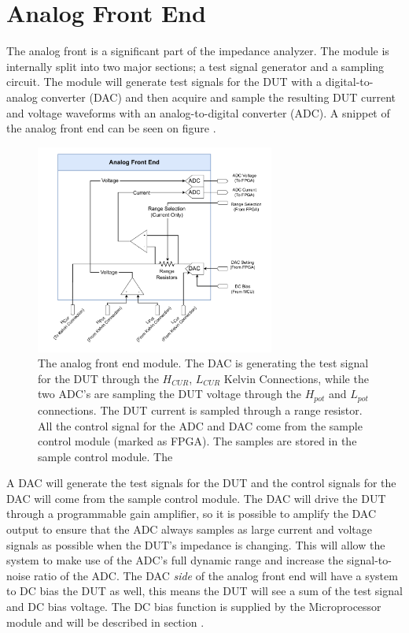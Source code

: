 \section{Analog Front End} \label{sec:AnalogFrontEnd}

The analog front is a significant part of the impedance analyzer. The module is internally split into two major sections; a test signal generator and a sampling circuit. The module will generate test signals for the DUT with a digital-to-analog converter (DAC) and then acquire and sample the resulting DUT current and voltage waveforms with an analog-to-digital converter (ADC). A snippet of the analog front end can be seen on figure .

\begin{figure}[H]
    \centering
    \includegraphics[clip, trim=18 0 18 0,width=0.70\textwidth]{Sections/6_SystemArchitecture/Figures/AnalogFrontEnd.pdf}
    \caption{The analog front end module. The DAC is generating the test signal for the DUT through the $H_{CUR}$, $L_{CUR}$ Kelvin Connections, while the two ADC's are sampling the DUT voltage through the $H_{pot}$ and $L_{pot}$ connections. The DUT current is sampled through a range resistor. All the control signal for the ADC and DAC come from the sample control module (marked as FPGA). The samples are stored in the sample control module. The  }
    \label{fig_6_1_AnalogFrontEnd}
\end{figure}

A DAC will generate the test signals for the DUT and the control signals for the DAC will come from the sample control module. The DAC will drive the DUT through a programmable gain amplifier, so it is possible to amplify the DAC output to ensure that the ADC always samples as large current and voltage signals as possible when the DUT's impedance is changing. This will allow the system to make use of the ADC's full dynamic range and increase the signal-to-noise ratio of the ADC. The DAC \textit{side} of the analog front end will have a system to DC bias the DUT as well, this means the DUT will see a sum of the test signal and DC bias voltage. The DC bias function is supplied by the Microprocessor module and will be described in section .


